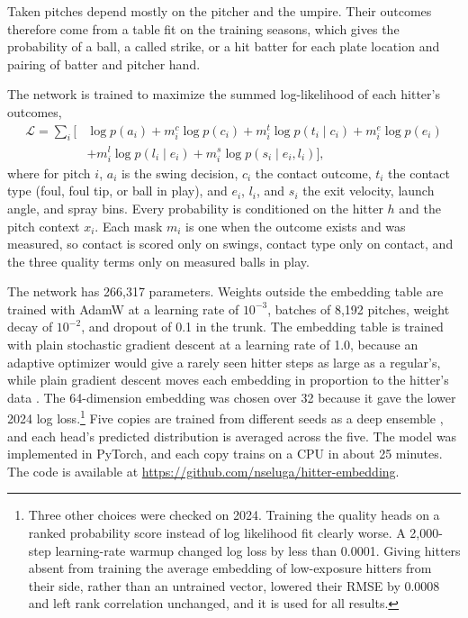 \documentclass[11pt,letterpaper]{article}
\begin{document}
Taken pitches depend mostly on the pitcher and the umpire. Their outcomes therefore come from a table fit on the training seasons, which gives the probability of a ball, a called strike, or a hit batter for each plate location and pairing of batter and pitcher hand.

The network is trained to maximize the summed log-likelihood of each hitter's outcomes,
\begin{equation}
\begin{split}
\mathcal{L} = \sum_{i} \Big[ & \log p(a_i) + m^{c}_i \log p(c_i) + m^{t}_i \log p(t_i \mid c_i) + m^{e}_i \log p(e_i) \\
& + m^{l}_i \log p(l_i \mid e_i) + m^{s}_i \log p(s_i \mid e_i, l_i) \Big],
\end{split}
\label{eq:loss}
\end{equation}
where for pitch $i$, $a_i$ is the swing decision, $c_i$ the contact outcome, $t_i$ the contact type (foul, foul tip, or ball in play), and $e_i$, $l_i$, and $s_i$ the exit velocity, launch angle, and spray bins. Every probability is conditioned on the hitter $h$ and the pitch context $x_i$. Each mask $m_i$ is one when the outcome exists and was measured, so contact is scored only on swings, contact type only on contact, and the three quality terms only on measured balls in play.

The network has 266,317 parameters. Weights outside the embedding table are trained with AdamW \citep{loshchilov2019} at a learning rate of $10^{-3}$, batches of 8,192 pitches, weight decay of $10^{-2}$, and dropout of 0.1 in the trunk. The embedding table is trained with plain stochastic gradient descent at a learning rate of 1.0, because an adaptive optimizer would give a rarely seen hitter steps as large as a regular's, while plain gradient descent moves each embedding in proportion to the hitter's data \citep{stollenwerk2025}. The 64-dimension embedding was chosen over 32 because it gave the lower 2024 log loss.\footnote{Three other choices were checked on 2024. Training the quality heads on a ranked probability score instead of log likelihood fit clearly worse. A 2,000-step learning-rate warmup changed log loss by less than 0.0001. Giving hitters absent from training the average embedding of low-exposure hitters from their side, rather than an untrained vector, lowered their RMSE by 0.0008 and left rank correlation unchanged, and it is used for all results.} Five copies are trained from different seeds as a deep ensemble \citep{lakshminarayanan2017}, and each head's predicted distribution is averaged across the five. The model was implemented in PyTorch, and each copy trains on a CPU in about 25 minutes. The code is available at \url{https://github.com/nseluga/hitter-embedding}.
\end{document}
